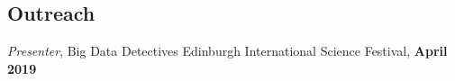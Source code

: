 \documentclass[margin,line]{res}
\newenvironment{list2}{
  \begin{list}{$\bullet$}{%
      \setlength{\itemsep}{0in}
      \setlength{\parsep}{0in} \setlength{\parskip}{0in}
      \setlength{\topsep}{0in} \setlength{\partopsep}{0in} 
      \setlength{\leftmargin}{0.2in}}}{\end{list}}
\begin{document}
\begin{resume}
%




\section{\sc Outreach} 

\vspace{-.2cm}
{\em Presenter}, Big Data Detectives \hfill  Edinburgh International Science Festival,  {\bf April 2019}\\
\vspace{-.5cm}


\end{resume}
\end{document}
